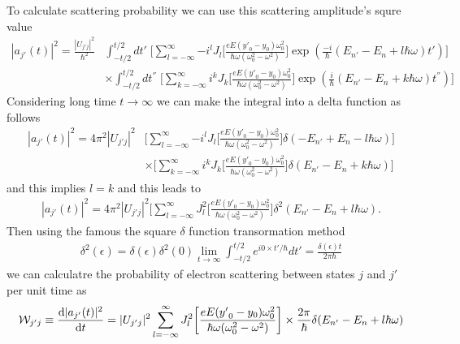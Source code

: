 To calculate scattering probability we can use this scattering amplitude's squre value
\begin{equation} \label{2.22}
  \begin{aligned}
    |a_{j'}(t)|^2  =
   \frac{|U_{j'j}|^2}{\hbar^2} &
   \int_{-t/2}^{t/2} dt' \;
   \bigg[
   \sum_{l=-\infty}^{\infty} {-i}^l J_l\bigg[\frac{eE({y'}_0 - y_0)\omega_0^2}{\hbar\omega(\omega_0^2-\omega^2)}\bigg]
     \exp(
    \frac{-i}{\hbar} (E_{n'} -E_{n} + l\hbar\omega) t')
    \bigg] \\
    & \times
    \int_{-t/2}^{t/2} dt^{''} \;
    \bigg[
    \sum_{k=-\infty}^{\infty} i^k J_k\bigg[\frac{eE({y'}_0 - y_0)\omega_0^2}{\hbar\omega(\omega_0^2-\omega^2)}\bigg]
      \exp(
     \frac{i}{\hbar} (E_{n'} -E_{n} + k\hbar\omega) t^{''})
     \bigg]
  \end{aligned}
\end{equation}
Considering long time $t\rightarrow \infty$ we can make the integral into a delta function as follows
\begin{equation} \label{2.23}
  \begin{aligned}
    |a_{j'}(t)|^2  =
   4\pi^2|U_{j'j}|^2 &
   \bigg[
   \sum_{l=-\infty}^{\infty} {-i}^l J_l\bigg[\frac{eE({y'}_0 - y_0)\omega_0^2}{\hbar\omega(\omega_0^2-\omega^2)}\bigg]
     \delta(-E_{n'} +E_{n} - l\hbar\omega)
     \bigg] \\
    & \times
    \bigg[
    \sum_{k=-\infty}^{\infty} i^k J_k\bigg[\frac{eE({y'}_0 - y_0)\omega_0^2}{\hbar\omega(\omega_0^2-\omega^2)}\bigg]
      \delta(E_{n'} - E_{n} + k\hbar\omega)
     \bigg]
  \end{aligned}
\end{equation}
and this implies $l=k$ and this leads to
\begin{equation} \label{2.24}
  \begin{aligned}
    |a_{j'}(t)|^2  =
   4\pi^2|U_{j'j}|^2
   \bigg[
   \sum_{l=-\infty}^{\infty} J_l^2\bigg[\frac{eE({y'}_0 - y_0)\omega_0^2}{\hbar\omega(\omega_0^2-\omega^2)}\bigg]
     \delta^2(E_{n'} - E_{n} + l\hbar\omega).
  \end{aligned}
\end{equation}
Then using the famous the square $\delta$ function transormation method
\begin{equation} \label{2.25}
  \begin{aligned}
     \delta^2(\epsilon ) = \delta(\epsilon )\delta^2(0)
     \lim_{t\rightarrow\infty} \int_{-t/2}^{t/2} e^{i0\times t' /\hbar} dt' =
     \frac{\delta(\epsilon) t}{2\pi \hbar}
  \end{aligned}
\end{equation}
we can calculatre the probability of electron scattering between states $j$ and $j'$ per unit time as
\begin{equation} \label{2.26}
    \mathcal{W}_{j'j} \equiv \dv{|a_{j'}(t)|^2}{t} =
    |U_{j'j}|^2
     \sum_{l=-\infty}^{\infty} J_l^2\bigg[\frac{eE({y'}_0 - y_0)\omega_0^2}{\hbar\omega(\omega_0^2-\omega^2)}\bigg]
    \times
    \frac{2\pi}{\hbar} \delta(E_{n'} - E_{n} + l\hbar\omega)
\end{equation}

